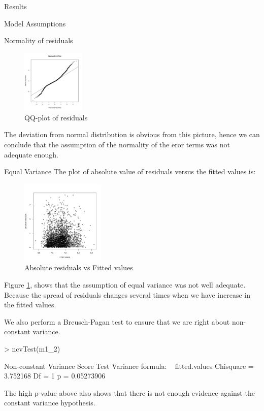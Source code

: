 \documentclass[a4paper,11pt]{article}
\begin{document}
\begin{section}{Results}
\begin{subsection}{Model Assumptions}
\begin{subsubsection}{Normality of residuals}
\begin{figure}[h]
\includegraphics [width=3cm,height=3cm]{norm-ass}
\caption{QQ-plot of residuals}
\end{figure}

The deviation from normal distribution is obvious from this picture, hence we can conclude that the assumption of the normality of the eror terms was not adequate enough.
\end{subsubsection}
\begin{subsubsection}{Equal Variance}
The plot of absolute value of residuals versus the fitted values is:\\

\begin{figure}[h]
\includegraphics [width=4cm,height=4cm]{var-ass}
\caption{Absolute residuals vs Fitted values}
\label{var-ch}
\end{figure}

Figure \ref{var-ch}, shows that the assumption of equal variance was not well adequate. Because the spread of residuals changes several times when we have increase in the fitted values.

We also perform a Breusch-Pagan test to ensure that we are right about non-constant variance.
\begin{Schunk}
\begin{Sinput}
> ncvTest(m1_2)
\end{Sinput}
\begin{Soutput}
Non-constant Variance Score Test 
Variance formula: ~ fitted.values 
Chisquare = 3.752168    Df = 1     p = 0.05273906 
\end{Soutput}
\end{Schunk}
The high p-value above also shows that there is not enough evidence against the constant variance hypothesis.
\end{subsubsection}


\end{subsection}
\end{section}
\end{document}

